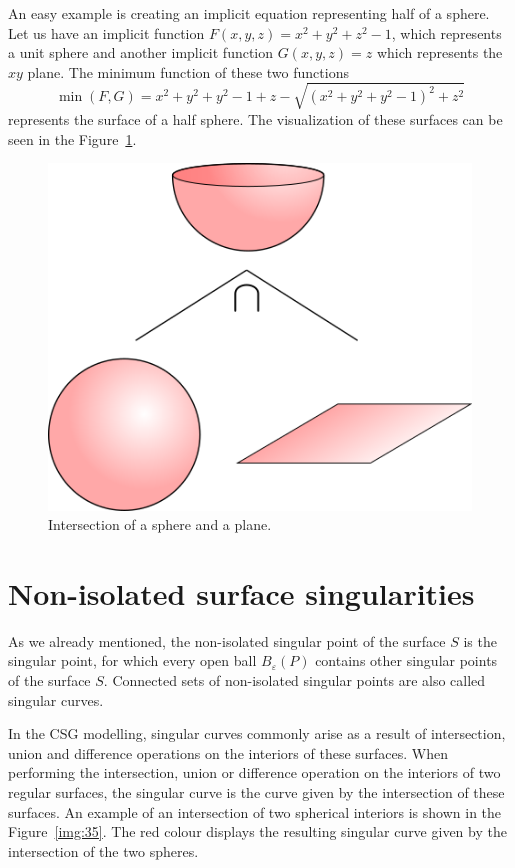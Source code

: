 An easy example is creating an implicit equation representing half of
a sphere. Let us have an implicit function 
$F(x, y, z) = x^2+y^2+z^2-1$, which represents a unit sphere and another
implicit function $G(x, y, z) = z$ which represents the $xy$ plane.
The minimum function of these two functions
$$\min(F, G) = x^2+y^2+y^2-1+z-\sqrt{(x^2+y^2+y^2-1)^2+z^2}$$ represents the
surface of a half sphere. The visualization of these surfaces can be seen in
the Figure~\ref{img:20}.
\begin{figure}[h!]
    \centerline{\includegraphics[scale=0.5]{images/img20}}
    \caption[Intersection of a sphere and a plane]
    {Intersection of a sphere and a plane.}
    \label{img:20}
\end{figure}


\section{Non-isolated surface singularities}
\label{sub2.3}

As we already mentioned, the non-isolated singular point of the surface $S$ is 
the singular point, for which
every open ball $B_\varepsilon(P)$ contains other singular points of the surface $S$.
Connected sets of non-isolated singular points are also called singular curves.

In the CSG modelling, singular curves commonly arise as a result of intersection,
union and difference operations on the interiors of these surfaces. When performing
the intersection, union or difference operation on the interiors of two regular surfaces, 
the singular curve is the curve given by the intersection of these surfaces. An example
of an intersection of two spherical interiors is shown in the Figure~\ref{img:35}. 
The red colour displays the resulting singular curve given by the intersection of the two spheres.

